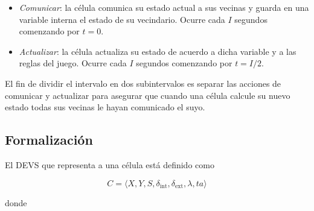 \documentclass[12pt]{article}
\newcommand{\dint}{\delta_{\text{int}}}
\newcommand{\dext}{\delta_{\text{ext}}}
\begin{document}
\begin{itemize}
  \item \textit{Comunicar}: la célula comunica su estado actual a sus vecinas y guarda en una variable interna el estado de su vecindario. Ocurre cada $I$ segundos comenzando por $t = 0$.
  \item \textit{Actualizar}: la célula actualiza su estado de acuerdo a dicha variable y a las reglas del juego. Ocurre cada $I$ segundos comenzando por $t = I/2$.
\end{itemize}

El fin de dividir el intervalo en dos subintervalos es separar las acciones de comunicar y actualizar para asegurar que cuando una célula calcule su nuevo estado todas sus vecinas le hayan comunicado el suyo.


\subsection{Formalización}


El DEVS que representa a una célula está definido como

\[ C = \langle X, Y, S, \dint, \dext, \lambda, ta \rangle \]

donde
\end{document}
